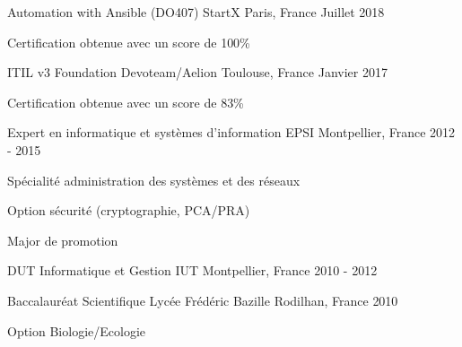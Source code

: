 

\begin{cventries}

  \cventry
    {Automation with Ansible (DO407)} %
    {StartX} %
    {Paris, France} %
    {Juillet 2018} %
    {
      \begin{cvitems} %
        \item {Certification obtenue avec un score de 100\%}
      \end{cvitems}
    }

\cventry
{ITIL v3 Foundation} %
{Devoteam/Aelion} %
{Toulouse, France} %
{Janvier 2017} %
{
  \begin{cvitems} %
    \item {Certification obtenue avec un score de 83\%}
  \end{cvitems}
}

\cventry
{Expert en informatique et systèmes d'information} %
{EPSI} %
{Montpellier, France} %
{2012 - 2015} %
{
  \begin{cvitems} %
    \item {Spécialité administration des systèmes et des réseaux}
    \item {Option sécurité (cryptographie, PCA/PRA)}
    \item {Major de promotion}
  \end{cvitems}
}

\cventry
{DUT Informatique et Gestion} %
{IUT} %
{Montpellier, France} %
{2010 - 2012} %
{}

\cventry
{Baccalauréat Scientifique} %
{Lycée Frédéric Bazille} %
{Rodilhan, France} %
{2010} %
{
  \begin{cvitems} %
    \item {Option Biologie/Ecologie}
  \end{cvitems}
}

\end{cventries}
